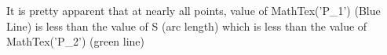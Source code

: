 \documentclass[preview]{standalone}
\begin{document}
\begin{center}
It is pretty apparent that at nearly all points, value of MathTex('P_1') (Blue Line) is less than the value of S (arc length) which is less than the value of MathTex('P_2') (green line)
\end{center}
\end{document}
